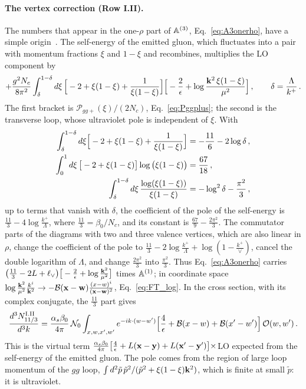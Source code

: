 \paragraph{The vertex correction (Row I.II).} The numbers that appear in the one-$\rho$ part of $\mathbb{A}^{(3)}$, Eq.~\eqref{eq:A3onerho}, have a simple origin~\cite{Lublinsky:2016meo}. The self-energy of the emitted gluon, which fluctuates into a pair with momentum fractions $\xi$ and $1-\xi$ and recombines, multiplies the LO component by
\begin{align}\label{eq:ex1_SE}
+\frac{g^2N_c}{8\pi^2}\int_{\delta}^{1-\delta}d\xi\,\Big[-2+\xi(1-\xi)+\frac{1}{\xi(1-\xi)}\Big]\Big[-\frac2\epsilon+\log\frac{\mathbf{k}^2\,\xi(1-\xi)}{\mu^2}\Big]\,,\qquad\delta=\frac{\Lambda}{k^+}\,.
\end{align}
The first bracket is $\mathcal P_{gg+}(\xi)/(2N_c)$, Eq.~\eqref{eq:Pggplus}; the second is the transverse loop, whose ultraviolet pole is independent of $\xi$. With
\begin{align}\label{eq:ex1_ints}
\int_\delta^{1-\delta}d\xi\Big[-2+\xi(1-\xi)+\frac{1}{\xi(1-\xi)}\Big]&=-\frac{11}{6}-2\log\delta\,,\notag\\
\int_0^1d\xi\,\big[-2+\xi(1-\xi)\big]\log\big(\xi(1-\xi)\big)&=\frac{67}{18}\,,\notag\\
\int_\delta^{1-\delta}d\xi\,\frac{\log(\xi(1-\xi))}{\xi(1-\xi)}&=-\log^2\delta-\frac{\pi^2}{3}\,,
\end{align}
up to terms that vanish with $\delta$, the coefficient of the pole of the self-energy is $\frac{11}{3}-4\log\frac{k^+}{\Lambda}$, where $\frac{11}{3}=\beta_0/N_c$, and its constant is $\frac{67}{9}-\frac{2\pi^2}{3}$. The commutator parts of the diagrams with two and three valence vertices, which are also linear in $\rho$, change the coefficient of the pole to $\frac{11}{3}-2\log\frac{k^+}{\Lambda}+\log(1-\frac{k^+}{\vee})$, cancel the double logarithm of $\Lambda$, and change $\frac{2\pi^2}{3}$ into $\frac{\pi^2}{3}$. Thus Eq.~\eqref{eq:A3onerho} carries $\big(\frac{11}{3}-2L+\ell_\vee\big)\big[-\frac{2}{\epsilon}+\log\frac{\mathbf{k}^2}{\mu^2}\big]$ times $\mathbb{A}^{(1)}$; in coordinate space $\log\frac{\mathbf{k}^2}{\mu^2}\frac{k^i}{\mathbf{k}^2}\to-\mathcal B(\mathbf{x}-\mathbf{w})\frac{(x-w)^i}{(\mathbf{x}-\mathbf{w})^2}$, Eq.~\eqref{eq:FT_log}. In the cross section, with its complex conjugate, the $\frac{11}{3}$ part gives
\begin{align}\label{eq:dg_II}
\frac{d^3N^{\rm I.II}_{11/3}}{d^3k}=\frac{\alpha_s\beta_0}{4\pi}\,\mathcal N_0\int_{x,w,x',w'}e^{-ik\cdot(w-w')}\Big[\frac{4}{\epsilon}+\mathcal B(x-w)+\mathcal B(x'-w')\Big]\,\mathcal O(w,w')\,.
\end{align}
This is the virtual term $\frac{\alpha_s\beta_0}{4\pi}\big[\frac4\epsilon+L(\mathbf{x}-\mathbf{y})+L(\mathbf{x}'-\mathbf{y}')\big]\times$LO expected from the self-energy of the emitted gluon. The pole comes from the region of large loop momentum of the $gg$ loop, $\int d^2\tilde p\,\tilde p^2/(\tilde p^2+\xi(1-\xi)\mathbf{k}^2)$, which is finite at small $\tilde p$: it is ultraviolet.

